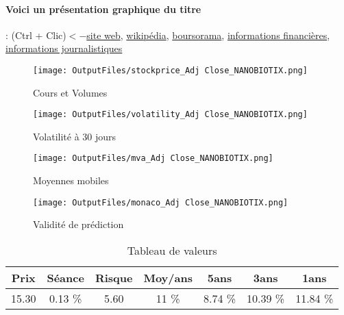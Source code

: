 \documentclass[11pt,a4paper]{report}%
\begin{document}
\paragraph{Voici un présentation graphique du titre} : (Ctrl + Clic)$<-$\href{https://www.nanobiotix.com/fr/professionnels-de-sante/}{site web}, \href{https://fr.wikipedia.org/wiki/Nanobiotix}{wikipédia}, \href{https://www.boursorama.com/cours/1rPNANO}{boursorama}, \href{https://www.qwant.com/?q=site:https:%2f%2fwww.easybourse.com%2faction-societe%2fNANOBIOTIX&t=web&client=ext-firefox-hp}{informations financières}, \href{https://bourse.lerevenu.com/cours-de-bourse/fiche-valeur-synthese/NANOBIOTIX/NANO-FR}{informations journalistiques}
\begin{figure}[!htb]
   \begin{minipage}{0.5\textwidth}
     \centering
     \texttt{[image: OutputFiles/stockprice\_Adj Close\_NANOBIOTIX.png]}
     \caption{Cours et Volumes}\label{Fig:price_NANOBIOTIX}
   \end{minipage}\hfill
   \begin{minipage}{0.5\textwidth}
     \centering
     \texttt{[image: OutputFiles/volatility\_Adj Close\_NANOBIOTIX.png]}
     \caption{Volatilité à 30 jours}\label{Fig:volat_NANOBIOTIX}
   \end{minipage}
\end{figure}
\begin{figure}[!htb]
   \begin{minipage}{0.5\textwidth}
     \centering
     \texttt{[image: OutputFiles/mva\_Adj Close\_NANOBIOTIX.png]}
     \caption{Moyennes mobiles}\label{Fig:mva_NANOBIOTIX}
   \end{minipage}\hfill
   \begin{minipage}{0.5\textwidth}
     \centering
     \texttt{[image: OutputFiles/monaco\_Adj Close\_NANOBIOTIX.png]}
     \caption{Validité de prédiction}\label{Fig:prediction_NANOBIOTIX}
   \end{minipage}
\end{figure}

\begin{table}[H]
  \centering
    \begin{tabular}{|c|c|c|c|c|c|c|}
    \hline
    Prix & Séance & Risque  & Moy/ans & 5ans & 3ans & 1ans \\
    \hline
    15.30 &    0.13 \%    & 5.60 & 11 \% & 8.74 \% & 10.39 \% & 11.84 \% \\
    \hline
    \end{tabular}%
        \label{tab:table_NANOBIOTIX}%
      \caption{Tableau de valeurs}
\end{table}%
\end{document}

